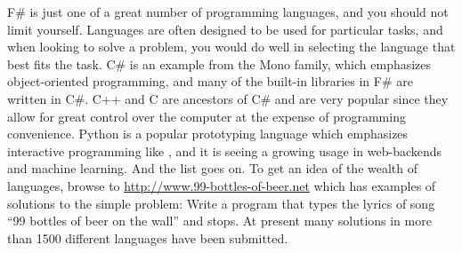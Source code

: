 \begin{description}
  F\# is just one of a great number of programming languages, and you should not limit yourself. Languages are often designed to be used for particular tasks, and when looking to solve a problem, you would do well in selecting the language that best fits the task. C\# is an example from the Mono family, which emphasizes object-oriented programming, and many of the built-in libraries in F\# are written in C\#. C++ and C are ancestors of C\# and are very popular since they allow for great control over the computer at the expense of programming convenience. Python is a popular prototyping language which emphasizes interactive programming like , and it is seeing a growing usage in web-backends and machine learning. And the list goes on. To get an idea of the wealth of languages, browse to \url{http://www.99-bottles-of-beer.net} which has examples of solutions to the simple problem: Write a program that types the lyrics of song ``99 bottles of beer on the wall'' and stops. At present many solutions in more than 1500 different languages have been submitted.
\end{description}

